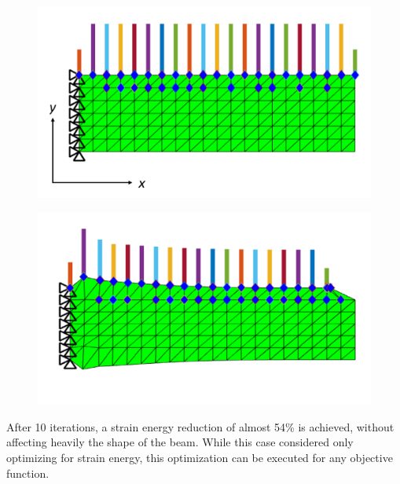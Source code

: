 \begin{figure}[ht]
\centering
\begin{minipage}{.5\textwidth}
  \centering
  \includegraphics[width=1.0\linewidth]{images/cantileverBeamBCs.png}
  \label{cantileverBeam:BCs2}
\end{minipage}%
\begin{minipage}{.5\textwidth}
  \centering
  \includegraphics[width=1.0\linewidth]{images/cantileverBeamOptimized.png}
  \label{fig:optimizedGeometry}
\end{minipage}
\end{figure}
After 10 iterations, a strain energy reduction of almost 54\% is achieved, without affecting heavily the shape of the beam. While this case considered only optimizing for strain energy, this optimization can be executed for any objective function.\\[3pt]
